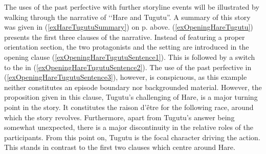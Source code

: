 The uses of the past perfective with further storyline events will be illustrated by walking through the narrative of \lq\lq Hare and Tugutu''. A summary of this story was given in (\ref{exHareTugutuSummary}) on p.\nobreakspace\pageref{exHareTugutuSummary} above. (\ref{exOpeningHareTugutu}) presents the first three clauses of the narrative. Instead of featuring a proper orientation section, the two protagonists and the setting are introduced in the opening clause (\ref{exOpeningHareTugutuSentence1}). This is followed by a switch to the  in (\ref{exOpeningHareTugutuSentence2}). The use of the past perfective in (\ref{exOpeningHareTugutuSentence3}), however, is conspicuous, as this example neither constitutes an episode boundary nor backgrounded material. However, the proposition given in this clause, Tugutu's challenging of Hare, is a major turning point in the story. It constitutes the raison d'être for the following race, around which the story revolves. Furthermore, apart from Tugutu's answer being somewhat unexpected, there is a major discontinuity in the relative roles of the participants. From this point on, Tugutu is the focal character driving the action. This stands in contrast to the first two clauses which centre around Hare.
